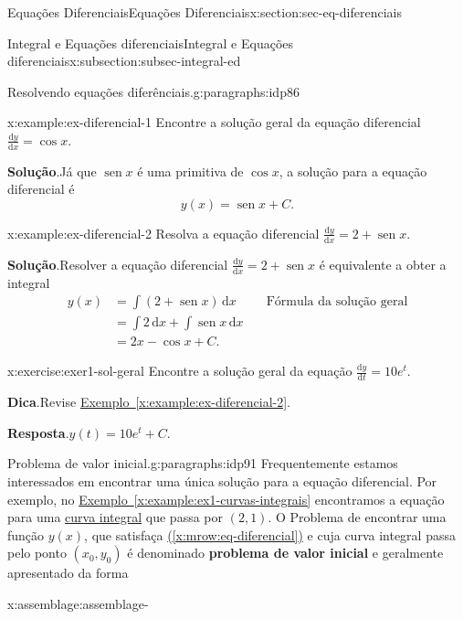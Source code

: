 \documentclass[oneside,10pt,]{article}
\newcommand{\blocktitlefont}{\relax}
\newcommand{\xreffont}{\relax}
\newcommand{\terminology}[1]{\textbf{#1}}
\numberwithin{equation}{section}
\newcommand{\dd}{\mathrm{d}}
\newcommand{\integral}[2]{\displaystyle\int {#1}\,\dd {#2}}
\DeclareMathOperator{\sin}{sen}
\newcommand{\amp}{&}
\begin{document}
\begin{sectionptx}{Equações Diferenciais}{}{Equações Diferenciais}{}{}{x:section:sec-eq-diferenciais}
\begin{subsectionptx}{Integral e Equações diferenciais}{}{Integral e Equações diferenciais}{}{}{x:subsection:subsec-integral-ed}
\begin{paragraphs}{Resolvendo equações diferênciais.}{g:paragraphs:idp86}%
\begin{example}{}{x:example:ex-diferencial-1}%
Encontre a solução geral da equação diferencial  \(\frac{\dd y}{\dd x} = \cos{x}\).%
\par\smallskip%
\noindent\textbf{\blocktitlefont Solução}.\hypertarget{g:solution:idp87}{}\quad{}Já que \(\sin{x}\) é uma primitiva de \(\cos{x}\), a solução para a equação diferencial é%
\begin{equation*}
y(x) = \sin{x} + C.
\end{equation*}
%
\end{example}
\begin{example}{}{x:example:ex-diferencial-2}%
Resolva a equação diferencial \(\frac{\dd y}{\dd x} = 2 + \sin{x}\).%
\par\smallskip%
\noindent\textbf{\blocktitlefont Solução}.\hypertarget{g:solution:idp88}{}\quad{}Resolver a equação diferencial \(\frac{\dd y}{\dd x} = 2 + \sin{x}\) é equivalente a obter a integral%
\begin{align*}
y(x) \amp = \integral{\left(2+ \sin{x}\right)}{x} \amp \quad \hyperref[x:assemblage:asse-sol-eq-diferencial]{\text{Fórmula da solução geral}} \\
\amp =\integral{2}{x} + \integral{\sin{x}}{x}\\
\amp = 2x -\cos{x} + C\text{.}
\end{align*}
%
\end{example}
\begin{inlineexercise}{}{x:exercise:exer1-sol-geral}%
Encontre a solução geral da equação \(\frac{\dd y}{\dd t}=10e^t\).%
\par\smallskip%
\noindent\textbf{\blocktitlefont Dica}.\hypertarget{g:hint:idp89}{}\quad{}Revise \hyperref[x:example:ex-diferencial-2]{Exemplo~{\xreffont\ref{x:example:ex-diferencial-2}}}.%
\par\smallskip%
\noindent\textbf{\blocktitlefont Resposta}.\hypertarget{g:answer:idp90}{}\quad{}\(y(t)= 10e^t + C\).%
\end{inlineexercise}%
\end{paragraphs}%
\begin{paragraphs}{Problema de valor inicial.}{g:paragraphs:idp91}%
Frequentemente estamos interessados em encontrar uma única solução para a  equação diferencial. Por exemplo, no \hyperref[x:example:ex1-curvas-integrais]{Exemplo~{\xreffont\ref{x:example:ex1-curvas-integrais}}} encontramos a equação para uma \hyperref[x:definition:curvas-integrais]{curva integral} que passa por \((2,1)\). O Problema de encontrar uma função    \(y(x)\), que satisfaça \hyperref[x:mrow:eq-diferencial]{({\xreffont\ref{x:mrow:eq-diferencial}})} e cuja curva integral passa pelo ponto \((x_0,y_0)\)  é denominado    \terminology{problema de valor inicial} e geralmente apresentado da forma \begin{assemblage}{}{x:assemblage:assemblage-}%

\end{assemblage}
\end{paragraphs}
\end{subsectionptx}
\end{sectionptx}
\end{document}

